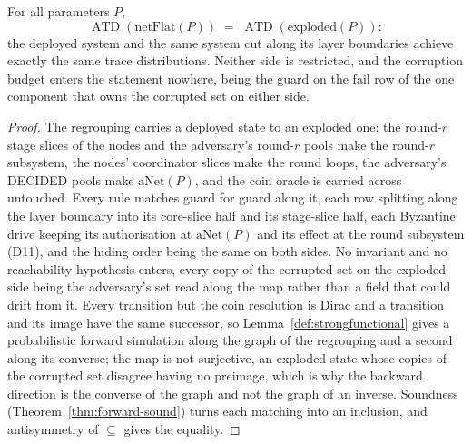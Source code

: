 \begin{theorem}
  \label{thm:aba-exploded-atd}
  \leanok
  For all parameters $P$,
  \[
    \operatorname{ATD}(\mathrm{netFlat}(P)) \;=\;
    \operatorname{ATD}(\mathrm{exploded}(P)) :
  \]
  the deployed system and the same system cut along its layer boundaries achieve exactly the same trace distributions.
  Neither side is restricted, and the corruption budget enters the statement nowhere, being the guard on the $\mathrm{fail}$ row of the one component that owns the corrupted set on either side.
\end{theorem}

\begin{proof}\leanok
  The regrouping  carries a deployed state to an exploded one: the round-$r$ stage slices of the nodes and the adversary's round-$r$ pools make the round-$r$ subsystem, the nodes' coordinator slices make the round loops, the adversary's DECIDED pools make $\mathrm{aNet}(P)$, and the coin oracle is carried across untouched.
  Every rule matches guard for guard along it, each row splitting along the layer boundary into its core-slice half and its stage-slice half, each Byzantine drive keeping its authorisation at $\mathrm{aNet}(P)$ and its effect at the round subsystem (D11), and the hiding order being the same on both sides.
  No invariant and no reachability hypothesis enters, every copy of the corrupted set on the exploded side being the adversary's set read along the map rather than a field that could drift from it.
  Every transition but the coin resolution is Dirac and a transition and its image have the same successor, so Lemma~\ref{def:strongfunctional} gives a probabilistic forward simulation along the graph of the regrouping and a second along its converse; the map is not surjective, an exploded state whose copies of the corrupted set disagree having no preimage, which is why the backward direction is the converse of the graph and not the graph of an inverse.
  Soundness (Theorem~\ref{thm:forward-sound}) turns each matching into an inclusion, and antisymmetry of $\subseteq$ gives the equality.
\end{proof}
